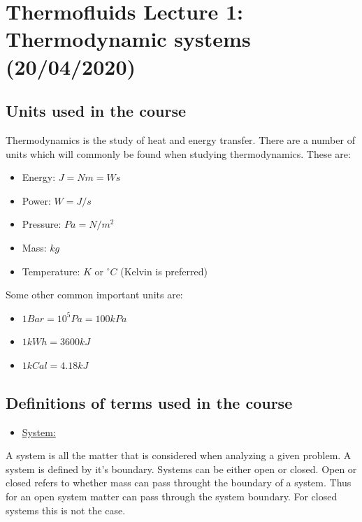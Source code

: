 \documentclass[11pt, a4paper]{article}
\begin{document}
\section{Thermofluids Lecture 1: Thermodynamic systems (20/04/2020)}
\subsection{Units used in the course}
Thermodynamics is the study of heat and energy transfer. There are a number of units which will commonly be found when studying thermodynamics. These are:
\begin{itemize}
  \item Energy: $J = Nm = Ws$
  \item Power: $W = J/s$
  \item Pressure: $Pa = N/m^2$
  \item Mass: $kg$
  \item Temperature: $K$ or $^\circ C$ (Kelvin is preferred)
\end{itemize}
Some other common important units are:
\begin{itemize}
  \item $1 Bar = 10^5 Pa = 100 kPa$
  \item $1 kWh = 3600 kJ$
  \item $1 kCal = 4.18 kJ$
\end{itemize}

\subsection{Definitions of terms used in the course}
\begin{itemize}
  \item \underline{System:}
\end{itemize}
A system is all the matter that is considered when analyzing a given problem. A system is defined by it's boundary. Systems can be either open or closed. Open or closed refers to whether mass can pass throught the boundary of a system. Thus for an open system matter can pass through the system boundary. For closed systems this is not the case.\\
\end{document}
